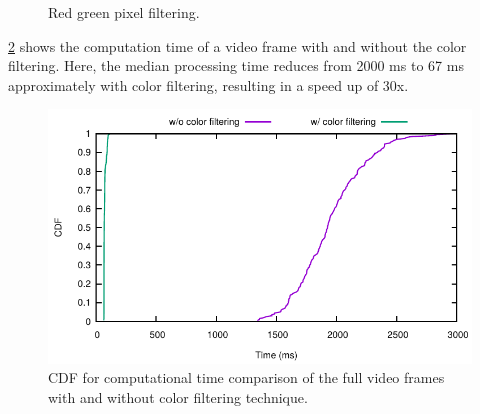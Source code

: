 \begin{figure}[!ht]
\centering
{}
\hfill
{}
\caption{Red green pixel filtering.}
\label{f:fil_img}
\end{figure}


\ref{f:clrfil} shows the computation time of a video frame with and without the color filtering. 
Here, the median processing time reduces from 2000 ms to 67 ms approximately with color filtering, resulting in a speed up of 30x. 


\begin{figure}[h]
\centering
\includegraphics[width=5.2in]{plots/cdf_clrfil_full.pdf}
\caption{CDF for computational time comparison of the full video frames with and without color filtering technique.}
\label{f:clrfil}
\end{figure}


